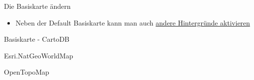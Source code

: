 \documentclass[ignorenonframetext,]{beamer}
\newenvironment{Shaded}{}{}
\newcommand{\KeywordTok}[1]{\textcolor[rgb]{0.00,0.44,0.13}{\textbf{{#1}}}}
\newcommand{\DataTypeTok}[1]{\textcolor[rgb]{0.56,0.13,0.00}{{#1}}}
\newcommand{\DecValTok}[1]{\textcolor[rgb]{0.25,0.63,0.44}{{#1}}}
\newcommand{\FloatTok}[1]{\textcolor[rgb]{0.25,0.63,0.44}{{#1}}}
\newcommand{\StringTok}[1]{\textcolor[rgb]{0.25,0.44,0.63}{{#1}}}
\newcommand{\NormalTok}[1]{{#1}}
\providecommand{\tightlist}{%
\setlength{\itemsep}{0pt}\setlength{\parskip}{0pt}}
\begin{document}
\begin{frame}[fragile]{Die Basiskarte ändern}

\begin{itemize}
\tightlist
\item
  Neben der Default Basiskarte kann man auch
  \href{http://leaflet-extras.github.io/leaflet-providers/preview/index.html}{andere
  Hintergründe aktivieren}
\end{itemize}

\begin{Shaded}
\end{Shaded}

\end{frame}

\begin{frame}[fragile]{Basiskarte - CartoDB}

\begin{Shaded}
\end{Shaded}

\end{frame}

\begin{frame}[fragile]{Esri.NatGeoWorldMap}

\begin{Shaded}
\end{Shaded}

\end{frame}

\begin{frame}[fragile]{OpenTopoMap}

\begin{Shaded}
\end{Shaded}

\end{frame}
\end{document}
